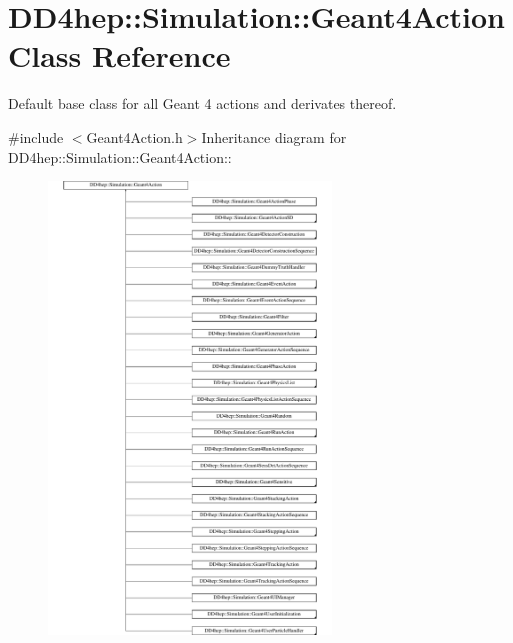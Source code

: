 \hypertarget{class_d_d4hep_1_1_simulation_1_1_geant4_action}{
\section{DD4hep::Simulation::Geant4Action Class Reference}
\label{class_d_d4hep_1_1_simulation_1_1_geant4_action}
}


Default base class for all Geant 4 actions and derivates thereof.  


{\ttfamily \#include $<$Geant4Action.h$>$}Inheritance diagram for DD4hep::Simulation::Geant4Action::\begin{figure}[H]
\begin{center}
\leavevmode
\includegraphics[height=12cm]{class_d_d4hep_1_1_simulation_1_1_geant4_action}
\end{center}
\end{figure}
